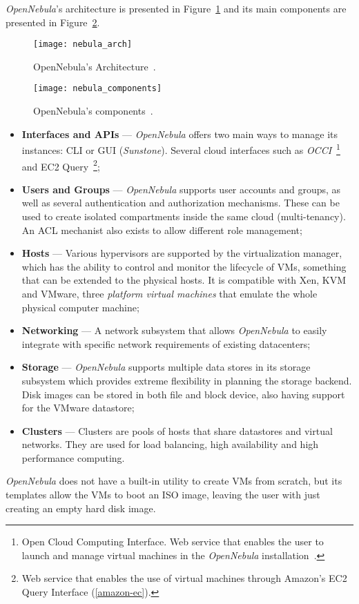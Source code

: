 \textit{OpenNebula}'s architecture is presented in Figure~\ref{fig:nebula_arch} and its main components are presented in Figure~\ref{fig:nebula_components}.

\begin{figure}[h!]
  \begin{center}
    \leavevmode
    \texttt{[image: nebula\_arch]}
    \caption{OpenNebula's Architecture~\cite{nebulatech}.}
    \label{fig:nebula_arch}
  \end{center}
\end{figure}

\begin{figure}[h!]
  \begin{center}
    \leavevmode
    \texttt{[image: nebula\_components]}
    \caption{OpenNebula's components~\cite{nebulacomponents}.}
    \label{fig:nebula_components}
  \end{center} 
\end{figure}


\begin{itemize}
\item \textbf{Interfaces and APIs} --- \textit{OpenNebula} offers two main ways to manage its instances: CLI or GUI (\textit{Sunstone}). Several cloud interfaces such as \textit{OCCI}~\footnote{Open Cloud Computing Interface. Web service that enables the user to launch and manage virtual machines in the \textit{OpenNebula} installation~\cite{occi}.} and EC2 Query~\footnote{Web service that enables the use of virtual machines through Amazon's EC2 Query Interface (\ref{amazon-ec}).};
\item \textbf{Users and Groups} --- \textit{OpenNebula} supports user accounts and groups, as well as several authentication and authorization mechanisms. These can be used to create isolated compartments inside the same cloud (multi-tenancy). An ACL mechanist also exists to allow different role management;
\item \textbf{Hosts} --- Various hypervisors are supported by the virtualization manager, which has the ability to control and monitor the lifecycle of VMs, something that can be extended to the physical hosts. It is compatible with Xen, KVM and VMware, three \textit{platform virtual machines} that emulate the whole physical computer machine;
\item \textbf{Networking} --- A network subsystem that allows \textit{OpenNebula} to easily integrate with specific network requirements of existing datacenters;
\item \textbf{Storage} --- \textit{OpenNebula} supports multiple data stores in its storage subsystem which provides extreme flexibility in planning the storage backend. Disk images can be stored in both file and block device, also having support for the VMware datastore;
\item \textbf{Clusters} --- Clusters are pools of hosts that share datastores and virtual networks. They are used for load balancing, high availability and high performance computing.
\end{itemize}
\textit{OpenNebula} does not have a built-in utility to create VMs from scratch, but its templates allow the VMs to boot an ISO image, leaving the user with just creating an empty hard disk image.

